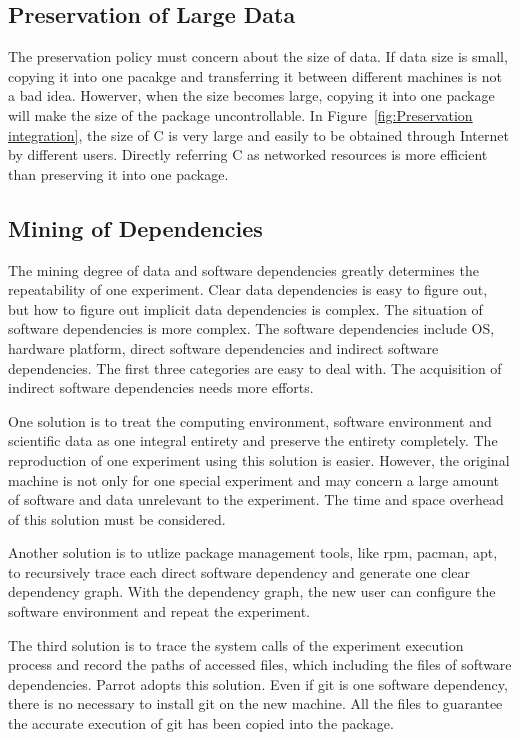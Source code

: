 \documentclass{acm_proc_article-sp}
\begin{document}
\subsection{Preservation of Large Data}

The preservation policy must concern about the size of data. If data size is
small, copying it into one pacakge and transferring it between different
machines is not a bad idea. Howerver, when the size becomes large, copying it
into one package will make the size of the package uncontrollable. In
Figure~\ref{fig:Preservation integration}, the size of C is very large and
easily to be obtained through Internet by different users. Directly referring C
as networked resources is more efficient than preserving it into one package.

\subsection{Mining of Dependencies} 

The mining degree of data and software dependencies greatly determines the
repeatability of one experiment. Clear data dependencies is easy to figure
out, but how to figure out implicit data dependencies is complex. The situation
of software dependencies is more complex. The software dependencies include OS,
hardware platform, direct software dependencies and indirect software
dependencies.
The first
three categories are easy to deal with. The acquisition of indirect software
dependencies needs more efforts. 

One solution is to treat the computing environment, software environment
and scientific data as one integral entirety and preserve the entirety
completely. The reproduction of one experiment using this solution is easier.
However, the original machine is not only for one special experiment and may
concern a large amount of software and data unrelevant to the experiment. The
time and space overhead of this solution must be considered.

Another solution is to utlize package management
tools, like rpm, pacman, apt, to recursively trace each direct software
dependency and generate one clear dependency graph. With the dependency graph,
the new user can configure the software environment and repeat the experiment.

The third solution is to trace the system calls of the experiment execution process
and record the paths of accessed files, which including the files of software dependencies.
Parrot adopts this solution. Even if git is one software dependency, there is no necessary to install git on the new machine.
All the files to guarantee the accurate execution of git has been copied into the package.
\end{document}
